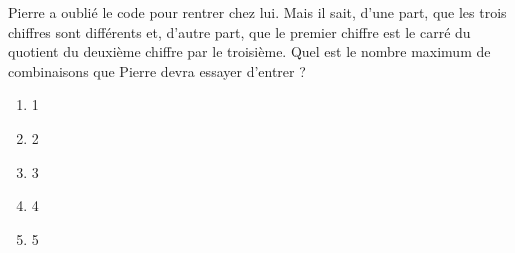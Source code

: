 Pierre a oublié le code pour rentrer chez lui. Mais il sait, d'une part, que les trois chiffres sont différents et, d'autre part, que le premier chiffre est le carré du quotient du deuxième chiffre par le troisième. Quel est le nombre maximum de combinaisons que Pierre devra essayer d'entrer ?
\begin{multicols}{5}
  \begin{enumerate}[A/]
  \item 1
  \item 2
  \item 3
  \item 4
  \item 5
  \end{enumerate}
\end{multicols}